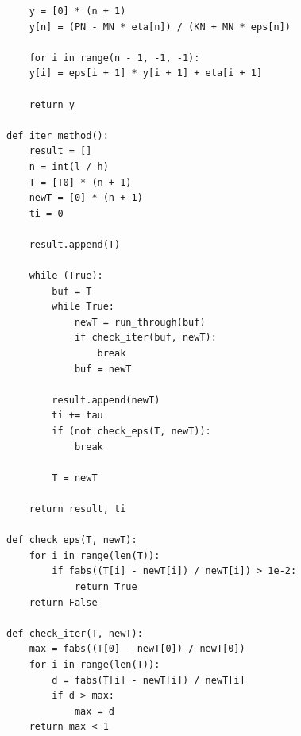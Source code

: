 \documentclass[14pt, a4paper]{extarticle}
\begin{document}
\begin{lstlisting}
	y = [0] * (n + 1)
	y[n] = (PN - MN * eta[n]) / (KN + MN * eps[n])
	
	for i in range(n - 1, -1, -1):
	y[i] = eps[i + 1] * y[i + 1] + eta[i + 1]
	
	return y

def iter_method():
	result = []
	n = int(l / h)
	T = [T0] * (n + 1)
	newT = [0] * (n + 1)
	ti = 0
	
	result.append(T)
	
	while (True):
		buf = T
		while True:
			newT = run_through(buf)
			if check_iter(buf, newT):
				break
			buf = newT
		
		result.append(newT)
		ti += tau
		if (not check_eps(T, newT)):
			break
		
		T = newT
	
	return result, ti

def check_eps(T, newT):
	for i in range(len(T)):
		if fabs((T[i] - newT[i]) / newT[i]) > 1e-2:
			return True
	return False

def check_iter(T, newT):
	max = fabs((T[0] - newT[0]) / newT[0])
	for i in range(len(T)):
		d = fabs(T[i] - newT[i]) / newT[i]
		if d > max:
			max = d
	return max < 1

\end{lstlisting}
\end{document}
